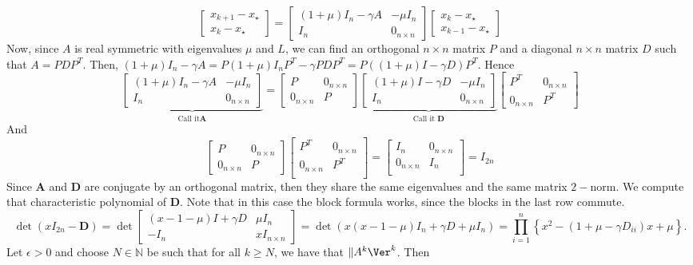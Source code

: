 \documentclass{article}
\begin{document}
$$
\begin{bmatrix}
x_{k+1}-x_\star \\
x_{k}-x_\star
\end{bmatrix}
=\begin{bmatrix}
(1+\mu)I_n-\gamma A & -\mu I_n \\
I_n & 0_{n \times n}
\end{bmatrix}
\begin{bmatrix}
x_k-x_\star \\
x_{k-1}-x_\star
\end{bmatrix}
$$
Now, since $A$ is real symmetric with eigenvalues $\mu$  and $L$, we can find an orthogonal $n \times n$ matrix $P$ and a diagonal $n \times n$ matrix $D$ such that $A=PDP^T$. Then, $(1+\mu)I_n-\gamma A=P(1+\mu)I_nP^T-\gamma PDP^T=P((1+\mu)I-\gamma D)P^T$. Hence
$$
\underbrace{\begin{bmatrix}
(1+\mu)I_n-\gamma A & -\mu I_n \\
I_n & 0_{n \times n}
\end{bmatrix}}_{\text{Call it} \mathbf{A}}
=\begin{bmatrix}
P & 0_{n \times n}\\
0_{n \times n} & P
\end{bmatrix}
\underbrace{
\begin{bmatrix}
(1+\mu)I-\gamma D& -\mu I_n \\
I_n & 0_{n \times n}
\end{bmatrix}}_{\text{Call it } \mathbf{D}}
\begin{bmatrix}
P^T & 0_{n \times n}\\
0_{n \times n} & P^T
\end{bmatrix}
$$
And 
$$
\begin{bmatrix}
P & 0_{n \times n}\\
0_{n \times n} & P
\end{bmatrix}
\begin{bmatrix}
P^T & 0_{n \times n}\\
0_{n \times n} & P^T\\
\end{bmatrix}
=
\begin{bmatrix}
I_n & 0_{n \times n}\\
0_{n \times n} & I_n\\
\end{bmatrix}
=I_{2n}
$$
Since $\mathbf{A}$ and $\mathbf{D}$ are conjugate by an orthogonal matrix, then they share the same eigenvalues and the same matrix $2-$norm. We compute that characteristic polynomial of $\mathbf{D}$. Note that in this case the block formula works, since the blocks in the last row commute.
$$
\det(xI_{2n}-\mathbf{D})=\det \begin{bmatrix}
(x-1-\mu)I+\gamma D& \mu I_n \\
-I_n & xI_{n \times n}
\end{bmatrix}
=\det(x(x-1-\mu)I_{n}+\gamma D+\mu I_{n})=\prod\limits_{i=1}^n \left\{x^2-(1+\mu-\gamma D_{ii})x+\mu\right\}.
$$
Let $\epsilon>0$ and choose $N \in \mathbb{N}$ be such that for all $k \geq N$, we have that $\Vert A^k \Ver^k$. Then
\end{document}
